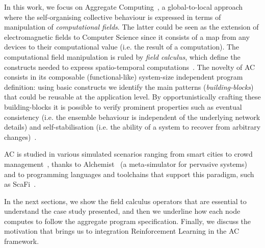 \documentclass[conference]{IEEEtran}
\begin{document}
In this work, we focus on Aggregate Computing~\cite{DBLP:journals/computer/BealPV15}, a global-to-local approach where
 the self-organising collective behaviour is expressed in terms of manipulation of \textit{computational fields}.
The latter could be seen as the extension of electromagnetic fields to Computer Science since it consists of a 
 map from any devices to their computational value (i.e. the result of a computation).
The computational field manipulation is ruled by \textit{field calculus}, which define the constructs needed 
 to express spatio-temporal computations~\cite{DBLP:journals/jlap/ViroliBDACP19}.
%
The novelty of AC consists in its composable (functional-like) system-size independent program definition: 
 using basic constructs we identify the main patterns (\textit{building-blocks}) that could be reusable at the application level.
By opportunistically crafting these building-blocks it is possible to verify prominent properties such as eventual consistency %
 (i.e. the ensemble behaviour is independent of the underlying network details)
 and self-stabilisation %
 (i.e. the ability of a system to recover from arbitrary changes)~\cite{DBLP:journals/jlap/ViroliBDACP19}.

AC is studied in various simulated scenarios ranging from smart cities to crowd management~\cite{DBLP:journals/jlap/ViroliBDACP19}, 
 thanks to Alchemist~\cite{DBLP:journals/jos/PianiniMV13} (a meta-simulator for pervasive systems) and to programming languages and toolchains that support 
 this paradigm, such as ScaFi~\cite{DBLP:conf/isola/CasadeiVAD20}. %

In the next sections, we show the field calculus operators that are essential to understand the case study presented,
 and then we underline how each node computes to follow the aggregate program specification.
 Finally, we discuss the motivation that brings us to integration Reinforcement Learning in the AC framework.
\end{document}
